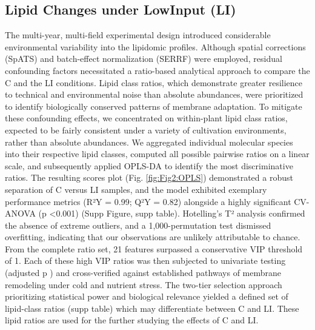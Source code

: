 \documentclass[10pt,letterpaper]{article}
\begin{document}
\subsection*{Lipid Changes under LowInput (LI)}
The multi-year, multi-field experimental design introduced considerable environmental variability into the lipidomic profiles. Although spatial corrections (SpATS) and batch-effect normalization (SERRF) were employed, residual confounding factors necessitated a ratio-based analytical approach to compare the C and the LI conditions. Lipid class ratios, which demonstrate greater resilience to technical and environmental noise than absolute abundances, were prioritized to identify biologically conserved patterns of membrane adaptation. To mitigate these confounding effects, we concentrated on within-plant lipid class ratios, expected to be fairly consistent under a variety of cultivation environments, rather than absolute abundances. We aggregated individual molecular species into their respective lipid classes, computed all possible pairwise ratios on a linear scale, and subsequently applied OPLS-DA to identify the most discriminative ratios. The resulting scores plot (Fig. \ref{fig:Fig2:OPLS}) demonstrated a robust separation of C versus LI samples, and the model exhibited exemplary performance metrics (R²Y = 0.99; Q²Y = 0.82) alongside a highly significant CV-ANOVA (p \textless 0.001) (Supp Figure, supp table). Hotelling’s T² analysis confirmed the absence of extreme outliers, and a 1,000-permutation test dismissed overfitting, indicating that our observations are unlikely attributable to chance. From the complete ratio set, 21 features surpassed a conservative VIP threshold of 1. Each of these high VIP ratios was then subjected to univariate testing (adjusted p ) and cross-verified against established pathways of membrane remodeling under cold and nutrient stress. The two-tier selection approach prioritizing statistical power and biological relevance yielded a defined set of lipid-class ratios (supp table) which may differentiate between C and LI. These lipid ratios are used for the further studying the effects of C and LI. 
\end{document}
